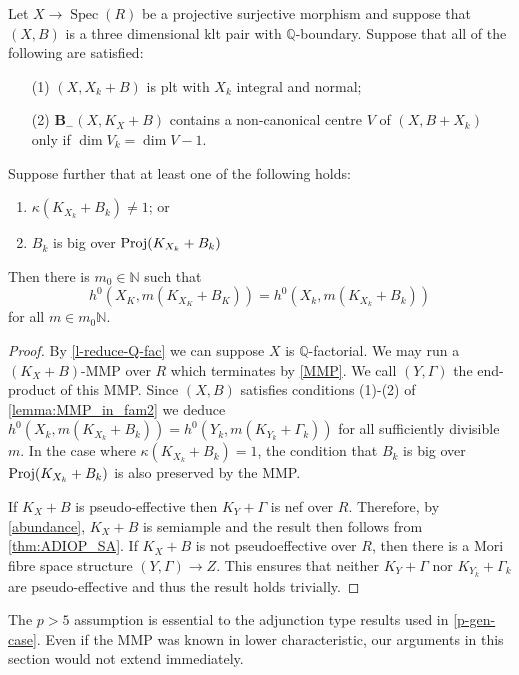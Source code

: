 \documentclass[a4paper,12pt]{book}
\DeclareMathOperator{\Spec}{Spec}
\begin{document}
	\begin{theorem}\label{thm:ADIOP_final2}
		Let $X \to \Spec(R)$ be a projective surjective morphism and suppose that $(X,B)$ is a three dimensional klt pair with $\mathbb{Q}$-boundary.
		Suppose that all of the following are satisfied:
		
		\begin{enumerate}
			\item[(1)] $(X, X_{k}+B)$ is plt with $X_k$ integral and normal;
			\item[(2)]  ${\mathbf{B}_{-}(X, K_{X}+B)}$ contains a non-canonical centre $V$ of $(X,B+X_{k})$ only if $\dim V_{k}=\dim V -1$.
		\end{enumerate}
		
		Suppose further that at least one of the following holds:
		\begin{enumerate}
			\item $\kappa(K_{X_{k}}+B_{k}) \neq 1$; or
			\item $B_{k}$ is big over $\textup{Proj}(K_{X_{k}}+B_{k})$
		\end{enumerate}	
		Then there is $m_{0} \in \mathbb{N}$ such that 
		$$h^{0}(X_{K},m(K_{X_{K}}+B_{K}))=h^{0}(X_{k},m(K_{X_{k}}+B_{k}))$$
		for all $m \in m_{0}\mathbb{N}$.
		
	\end{theorem}
	
	\begin{proof}
		By \autoref{l-reduce-Q-fac} we can suppose $X$ is $\mathbb{Q}$-factorial.
		We may run a $(K_X+B)$-MMP over $R$ which terminates by \autoref{MMP}. 
		We call $(Y,\Gamma)$ the end-product of this MMP. Since $(X,B)$ satisfies conditions (1)-(2) of \autoref{lemma:MMP_in_fam2} we deduce $h^{0}(X_{k},m(K_{X_{k}} + B_{k}))=h^0(Y_k, m(K_{Y_k}+\Gamma_k))$ for all sufficiently divisible $m$. 
		In the case where $\kappa(K_{X_{k}}+B_{k})=1$, the condition that $B_{k}$ is big over $\textup{Proj}(K_{X_{k}}+B_{k})$ is also preserved by the MMP.
		
		If $K_{X}+B$ is pseudo-effective then $K_Y+\Gamma$ is nef over $R$. Therefore, by \autoref{abundance}, $K_{X}+B$ is semiample and the result then follows from \autoref{thm:ADIOP_SA}. 
		If $K_X+B$ is not pseudoeffective over $R$, then there is a Mori fibre space structure $(Y,\Gamma) \to Z$. This ensures that neither $K_{Y}+\Gamma$ nor $K_{Y_{k}}+\Gamma_{k}$ are pseudo-effective and thus the result holds trivially. 
	\end{proof}
	
	
	\begin{remark}	
		The $p>5$ assumption is essential to the adjunction type results used  in \autoref{p-gen-case}. Even if the MMP was known in lower characteristic, our arguments in this section would not extend immediately.
	\end{remark}
	
	
	
\end{document}
